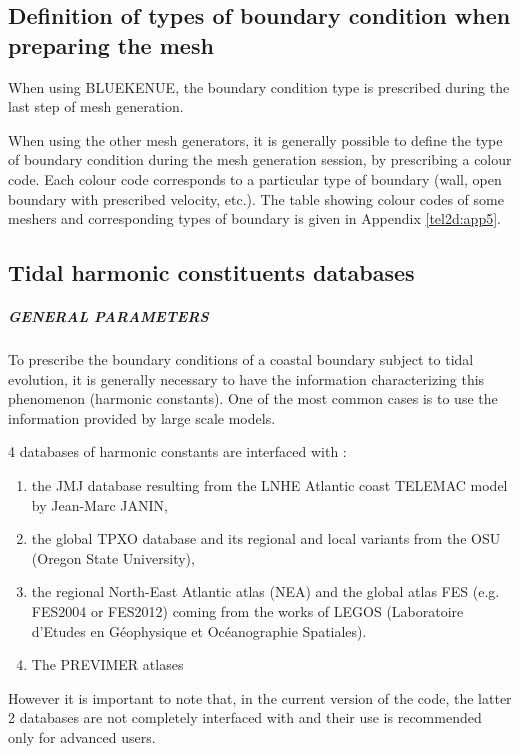 \subsection{ Definition of types of boundary condition when preparing the mesh}

 When using BLUEKENUE, the boundary condition type is prescribed during the last step of mesh generation.

 When using the other mesh generators, it is generally possible to define the type of boundary condition during the mesh generation session, by prescribing a colour code. Each colour code corresponds to a particular type of boundary (wall, open boundary with prescribed velocity, etc.). The table showing colour codes of some meshers and corresponding types of boundary is given in Appendix \ref{tel2d:app5}.


\subsection{ Tidal harmonic constituents databases}
\label{subs:tidal:harm:datab}

\subparagraph{ GENERAL PARAMETERS}

 To prescribe the boundary conditions of a coastal boundary subject to tidal evolution, it is generally necessary to have the information characterizing this phenomenon (harmonic constants). One of the most common cases is to use the information provided by large scale models.

 4 databases of harmonic constants are interfaced with :

\begin{enumerate}
\item  the JMJ database resulting from the LNHE Atlantic coast TELEMAC model by Jean-Marc JANIN,

\item  the global TPXO database and its regional and local variants from the OSU (Oregon State University),

\item  the regional North-East Atlantic atlas (NEA) and the global atlas FES (e.g. FES2004 or FES2012) coming from the works of LEGOS (Laboratoire d'Etudes en G\'{e}ophysique et Oc\'{e}anographie Spatiales).

\item  The PREVIMER atlases
\end{enumerate}

 However it is important to note that, in the current version of the code, the latter 2 databases are not completely interfaced with  and their use is recommended only for advanced users.

